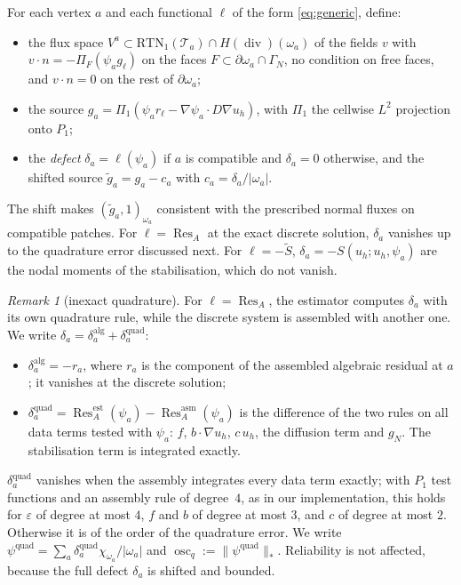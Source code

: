 \documentclass[11pt]{article}
\newcommand{\eps}{\varepsilon}
\newcommand{\Res}{\operatorname{Res}}
\newcommand{\osc}{\operatorname{osc}}
\newcommand{\Stil}{\tilde S}
\newcommand{\RTN}{\mathrm{RTN}_1}
\newcommand{\Hdiv}{H(\operatorname{div})}
\theoremstyle{plain}
\theoremstyle{remark}
\newtheorem{remark}[theorem]{Remark}
\numberwithin{equation}{section}
\begin{document}
For each vertex $a$ and each functional $\ell$ of the form \eqref{eq:generic}, define:
\begin{itemize}
  \item the flux space $V^a\subset\RTN(\mathcal T_a)\cap\Hdiv(\omega_a)$ of the fields $v$ with
  $v\cdot n=-\Pi_F(\psi_ag_\ell)$ on the faces $F\subset\partial\omega_a\cap\Gamma_N$, no condition
  on free faces, and $v\cdot n=0$ on the rest of $\partial\omega_a$;
  \item the source $g_a=\Pi_1(\psi_a r_\ell-\nabla\psi_a\cdot D\nabla u_h)$, with $\Pi_1$ the
  cellwise $L^2$ projection onto $P_1$;
  \item the \emph{defect} $\delta_a=\ell(\psi_a)$ if $a$ is compatible and $\delta_a=0$ otherwise,
  and the shifted source $\tilde g_a=g_a-c_a$ with $c_a=\delta_a/|\omega_a|$.
\end{itemize}
The shift makes $(\tilde g_a,1)_{\omega_a}$ consistent with the prescribed normal fluxes on
compatible patches. For $\ell=\Res_A$ at the exact discrete solution, $\delta_a$ vanishes up to the
quadrature error discussed next. For $\ell=-\Stil$, $\delta_a=-S(u_h;u_h,\psi_a)$ are the nodal
moments of the stabilisation, which do not vanish.

\begin{remark}[inexact quadrature]\label{rem:quad}
For $\ell=\Res_A$, the estimator computes $\delta_a$ with its own quadrature rule, while the discrete
system is assembled with another one. We write $\delta_a=\delta_a^{\mathrm{alg}}+\delta_a^{\mathrm{quad}}$:
\begin{itemize}
  \item $\delta_a^{\mathrm{alg}}=-r_a$, where $r_a$ is the component of the assembled algebraic
  residual at $a$; it vanishes at the discrete solution;
  \item $\delta_a^{\mathrm{quad}}=\Res_A^{\mathrm{est}}(\psi_a)-\Res_A^{\mathrm{asm}}(\psi_a)$ is
  the difference of the two rules on all data terms tested with $\psi_a$: $f$, $b\cdot\nabla u_h$,
  $c\,u_h$, the diffusion term and $g_N$. The stabilisation term is integrated exactly.
\end{itemize}
$\delta_a^{\mathrm{quad}}$ vanishes when the assembly integrates every data term exactly; with $P_1$
test functions and an assembly rule of degree~$4$, as in our implementation, this holds for $\eps$
of degree at most $4$, $f$ and $b$ of degree at most $3$, and $c$ of degree at most $2$. Otherwise it
is of the order of the quadrature error. We write
$\psi^{\mathrm{quad}}=\sum_a\delta_a^{\mathrm{quad}}\chi_{\omega_a}/|\omega_a|$ and
$\osc_q:=\|\psi^{\mathrm{quad}}\|_*$. Reliability is not affected, because the full defect
$\delta_a$ is shifted and bounded.
\end{remark}
\end{document}
